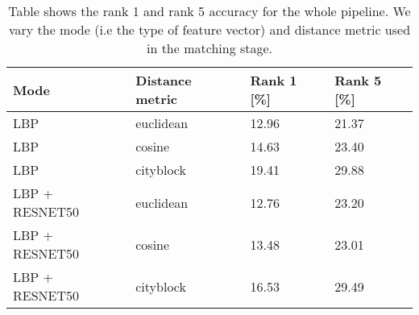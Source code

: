\begin{table}[h]
    \caption{Table shows the rank 1 and rank 5 accuracy for the whole pipeline. We vary the mode (i.e the type of feature vector) and distance metric used in the matching stage.}
    \begin{center}
        \begin{tabular}{llll}
            Mode & Distance metric & Rank 1 [\%] & Rank 5 [\%] \\ \hline
            LBP & euclidean & 12.96 & 21.37 \\ 
            LBP & cosine & 14.63 & 23.40 \\ 
            LBP & cityblock & 19.41 & 29.88 \\ 
            LBP + RESNET50 & euclidean & 12.76 & 23.20 \\ 
            LBP + RESNET50 & cosine & 13.48 & 23.01 \\ 
            LBP + RESNET50 & cityblock & 16.53 & 29.49 \\ 
        \end{tabular}
    \label{tab:pipeline_performance}
    \end{center}
\end{table}